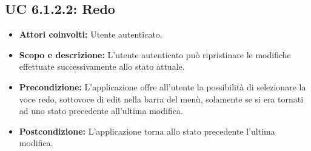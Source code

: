 \subsection{UC 6.1.2.2: Redo}
\begin{itemize}
		\item \textbf{Attori coinvolti:} Utente autenticato. \\
		\item \textbf{Scopo e descrizione:} L'utente autenticato può ripristinare le modifiche effettuate successivamente allo stato attuale. \\
		\item \textbf{Precondizione:} L'applicazione offre all'utente la possibilità di selezionare la voce redo, sottovoce di edit nella barra del menù, solamente se si era tornati ad uno stato precedente all'ultima modifica. \\
		\item \textbf{Postcondizione:} L'applicazione torna allo stato precedente l'ultima modifica. \\
\end{itemize}